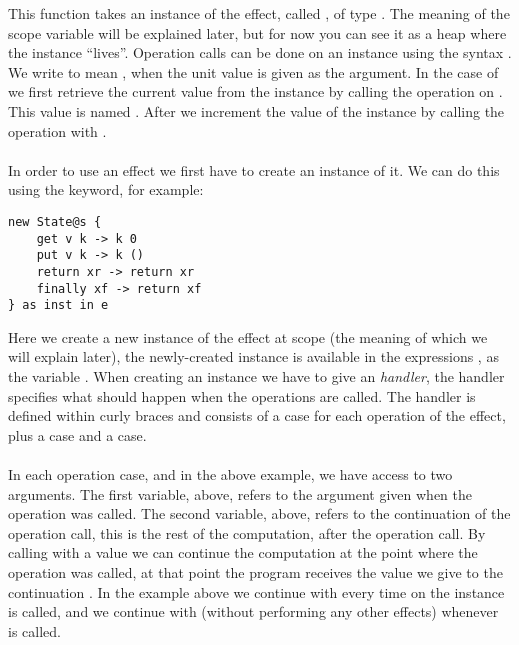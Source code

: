 This function takes an instance of the  effect, called , of type .
The meaning of the scope variable  will be explained later, but for now you can see it as a heap where the instance ``lives''.
Operation calls can be done on an instance using the syntax .
We write  to mean , when the unit value \ident{()} is given as the argument.
In the case of  we first retrieve the current value from the instance by calling the  operation on .
This value is named .
After we increment the value of the instance by calling the  operation with .
\\\\
In order to use an effect we first have to create an instance of it.
We can do this using the  keyword, for example:
\begin{verbatim}
new State@s {
	get v k -> k 0
	put v k -> k ()
	return xr -> return xr
	finally xf -> return xf
} as inst in e
\end{verbatim}
Here we create a new instance of the  effect at scope  (the meaning of which we will explain later), the newly-created instance is available in the expressions , as the variable .
When creating an instance we have to give an \emph{handler}, the handler specifies what should happen when the operations are called.
The handler is defined within curly braces and consists of a case for each operation of the effect, plus a  case and a  case.
\\\\
In each operation case,  and  in the above example, we have access to two arguments.
The first variable,  above, refers to the argument given when the operation was called.
The second variable,  above, refers to the continuation of the operation call, this is the rest of the computation, after the operation call.
By calling  with a value we can continue the computation at the point where the operation was called, at that point the program receives the value we give to the continuation .
In the example above we continue with  every time  on the instance  is called, and we continue with \ident{()} (without performing any other effects) whenever  is called.
\\\\

